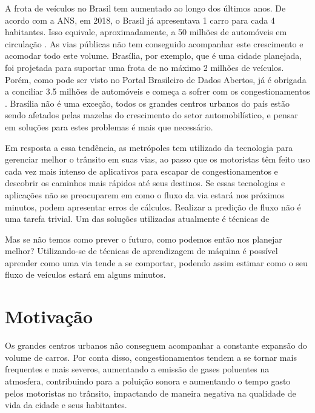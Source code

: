 A frota  de  veículos no Brasil tem aumentado ao longo  dos últimos anos. De acordo com a \acrfull{ANS}, em 2018, o Brasil já apresentava 1 carro para cada 4 habitantes. Isso equivale, aproximadamente, a 50 milhões de automóveis em circulação \cite{G1}. As vias públicas não tem conseguido acompanhar este crescimento e acomodar todo este volume. Brasília, por exemplo, que é uma cidade planejada, foi projetada para suportar uma frota de no máximo 2 milhões de veículos. Porém, como pode ser visto no Portal Brasileiro de Dados Abertos, já é obrigada a conciliar 3.5 milhões de automóveis e começa a sofrer com os congestionamentos \cite{detran_2018}. Brasília não é uma exceção, todos os grandes centros urbanos do país estão sendo afetados pelas mazelas do crescimento do setor automobilístico, e pensar em soluções para estes problemas é mais que necessário.

Em resposta a essa tendência, as metrópoles tem utilizado da tecnologia para gerenciar melhor o trânsito em suas vias, ao passo que os motoristas têm feito uso cada vez mais intenso de aplicativos para escapar de congestionamentos e descobrir os caminhos mais rápidos até seus destinos. Se essas tecnologias e aplicações não se preocuparem em como o fluxo da via estará nos próximos minutos, podem apresentar erros de cálculos. Realizar a predição de fluxo não é uma tarefa trivial. Um das soluções utilizadas atualmente é técnicas de



Mas se não temos como prever o futuro, como podemos então nos planejar melhor? Utilizando-se de técnicas de aprendizagem de máquina é possível aprender como uma via tende a se comportar, podendo assim estimar como o seu fluxo de veículos estará em alguns minutos.

\section{Motivação}

Os grandes centros urbanos não conseguem acompanhar a constante expansão do volume de carros. Por conta disso, congestionamentos tendem a se tornar mais frequentes e mais severos, aumentando a emissão de gases poluentes na atmosfera, contribuindo para a poluição sonora e aumentando o tempo gasto pelos motoristas no trânsito, impactando de maneira negativa na qualidade de vida da cidade e seus habitantes.

